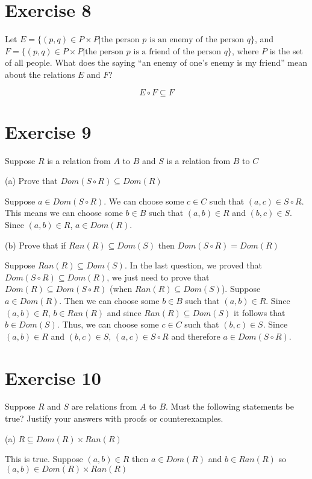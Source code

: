 \documentclass[11pt]{article}
\begin{document}
\section*{Exercise 8}

Let $E = \{(p,q) \in P \times P | \text{the person } p \text{ is an enemy of the person } q\}$,
and $F = \{(p,q) \in P \times P | \text{the person } p \text{ is a friend of the person } q\}$,
where $P$ is the set of all people. What does the saying ``an enemy of one's enemy is my friend''
mean about the relations $E$ and $F$?

$$E \circ F \subseteq F$$

\section*{Exercise 9}

Suppose $R$ is a relation from $A$ to $B$ and $S$ is a relation from $B$ to $C$

\noindent (a) Prove that $Dom(S \circ R) \subseteq Dom(R)$

Suppose $a \in Dom(S \circ R)$. We can choose some $c \in C$ such that 
$(a,c) \in S \circ R$. This means we can choose some $b \in B$ such that 
$(a, b) \in R$ and $(b,c) \in S$. Since $(a,b) \in R$, $a \in Dom(R)$.

\noindent (b) Prove that if $Ran(R) \subseteq Dom(S)$ then $Dom(S \circ R) = Dom(R)$

Suppose $Ran(R) \subseteq Dom(S)$. In the last question, we proved that 
$Dom(S \circ R) \subseteq Dom(R)$, we just need to prove that $Dom(R) \subseteq Dom(S \circ R)$
(when $Ran(R) \subseteq Dom(S)$). Suppose $a \in Dom(R)$. Then we can choose some 
$b \in B$ such that $(a,b) \in R$. Since $(a,b) \in R$, $b \in Ran(R)$ and since 
$Ran(R) \subseteq Dom(S)$ it follows that $b \in Dom(S)$. Thus, we can choose 
some $c \in C$ such that $(b,c) \in S$. Since $(a, b) \in R$ and $(b, c) \in S$,
$(a, c) \in S \circ R$ and therefore $a \in Dom(S \circ R)$.

\section*{Exercise 10}

Suppose $R$ and $S$ are relations from $A$ to $B$. Must the following statements 
be true? Justify your answers with proofs or counterexamples.

\noindent (a) $R \subseteq Dom(R) \times Ran(R)$

This is true. Suppose $(a, b) \in R$ then $a \in Dom(R)$ and $b \in Ran(R)$ so 
$(a,b) \in Dom(R) \times Ran(R)$
\end{document}
